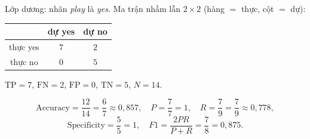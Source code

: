 Lớp dương: nhãn \emph{play} là \emph{yes}. Ma trận nhầm lẫn $2\times 2$ (hàng $=$ thực, cột $=$ dự):

\begin{center}
\begin{tabular}{c|cc}
      & dự yes & dự no \\\hline
thực yes & $7$ & $2$ \\
thực no  & $0$ & $5$ \\
\end{tabular}
\end{center}

$\mathrm{TP}=7$, $\mathrm{FN}=2$, $\mathrm{FP}=0$, $\mathrm{TN}=5$, $N=14$.

\[
\text{Accuracy}=\frac{12}{14}=\frac{6}{7}\approx0{,}857,\quad
P=\frac{7}{7}=1,\quad
R=\frac{7}{9}=\frac{7}{9}\approx0{,}778,
\]
\[
\text{Specificity}=\frac{5}{5}=1,\quad
F1=\frac{2PR}{P+R}=\frac{7}{8}=0{,}875.
\]

